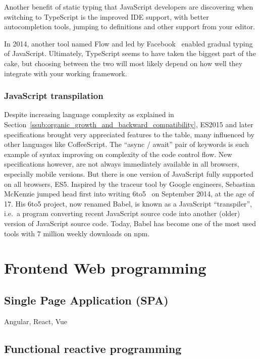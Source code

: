 Another benefit of static typing that JavaScript developers are discovering when
switching to TypeScript is the improved IDE support,
with better autocompletion tools, jumping to definitions and other support from your editor.

In 2014, another tool named Flow and led by Facebook~\cite{chaudhuri2017fast}
enabled gradual typing of JavaScript.
Ultimately, TypeScript seems to have taken the biggest part of the cake,
but choosing between the two will most likely depend on how well they integrate
with your working framework.

\subsubsection{JavaScript transpilation}%
\label{ssub:javascript_transpilation}

Despite increasing language complexity
as explained in Section~\ref{ssub:organic_growth_and_backward_compatibility},
ES2015 and later specifications brought very appreciated features to the table,
many influenced by other languages like CoffeeScript.
The ``async / await'' pair of keywords is such example of syntax
improving on complexity of the code control flow.
New specifications however, are not always immediately available in all browsers,
especially mobile versions.
But there is one version of JavaScript fully supported on all browsers, ES5.
Inspired by the traceur tool by Google engineers,
Sebastian McKenzie jumped head first into writing 6to5~\cite{babel}
on September 2014, at the age of 17.
His 6to5 project, now renamed Babel, is known as a JavaScript ``transpiler'',
i.e.\ a program converting recent JavaScript source code into another (older) version
of JavaScript source code.
Today, Babel has become one of the most used tools
with 7 million weekly downloads on npm.


\section{Frontend Web programming}%
\label{sec:frontend_web_programming}


\subsection{Single Page Application (SPA)}%
\label{sub:single_page_application_spa_}

Angular, React, Vue

\subsection{Functional reactive programming}%
\label{sub:functional_reactive_programming}

